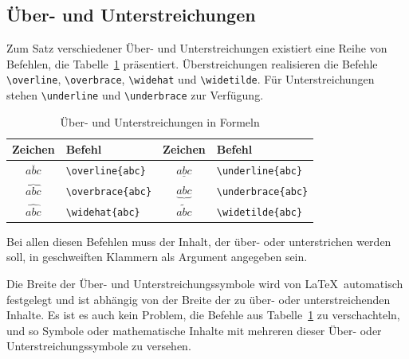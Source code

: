 \documentclass[a4paper,10pt,twoside]{scrbook}
\begin{document}
\subsection{Über- und Unterstreichungen}

Zum Satz verschiedener Über- und Unterstreichungen
existiert eine Reihe von Befehlen, die Tabelle~\ref{Tabelle_Ueberstreichungen_Unterstreichungen} präsentiert. 
Überstreichungen realisieren die Befehle
\verb!\overline!, 
\verb!\overbrace!, 
\verb!\widehat! und
\verb!\widetilde!. 
Für Unterstreichungen stehen 
\verb!\underline! und
\verb!\underbrace! zur Verfügung.

\begin{table}[h!tb]
\centering
\caption{Über- und Unterstreichungen in Formeln}
\label{Tabelle_Ueberstreichungen_Unterstreichungen}       %
\begin{tabular}{clcl}
\hline
Zeichen & Befehl & Zeichen & Befehl  \\
\hline
$\overline{abc}$ & \texttt{\textbackslash overline\{abc\}} & 
$\underline{abc}$ & \texttt{\textbackslash underline\{abc\}} \\
$\overbrace{abc}$ & \texttt{\textbackslash overbrace\{abc\}} &
$\underbrace{abc}$ & \texttt{\textbackslash underbrace\{abc\}} \\
$\widehat{abc}$ & \texttt{\textbackslash widehat\{abc\}} &
$\widetilde{abc}$ & \texttt{\textbackslash widetilde\{abc\}} \\
\hline
\end{tabular}
\end{table}


Bei allen diesen Befehlen muss der Inhalt, der über- oder unterstrichen
werden soll, in geschweiften Klammern als Argument angegeben sein. 

Die Breite der Über- und Unterstreichungssymbole
wird von \LaTeX\ automatisch festgelegt und
ist abhängig von der Breite der zu über- oder unterstreichenden Inhalte.
Es ist es auch kein Problem, die
Befehle aus Tabelle~\ref{Tabelle_Ueberstreichungen_Unterstreichungen} zu verschachteln, und so Symbole 
oder mathematische Inhalte mit mehreren dieser
Über- oder Unterstreichungssymbole zu versehen. 
\end{document}
